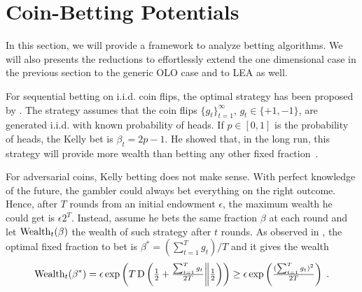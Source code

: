 \section{Coin-Betting Potentials}
\label{section:coin-betting-potentials}

In this section, we will provide a framework to analyze betting algorithms.
We will also presents the reductions to effortlessly extend the one dimensional case in the previous section to the
generic \ac{OLO} case and to \ac{LEA} as well.

For sequential betting on i.i.d. coin flips, the optimal strategy has been proposed by \citet{Kelly-1956}.
The strategy assumes that the coin flips $\{g_t\}_{t=1}^\infty$, $g_t
\in \{+1,-1\}$, are generated i.i.d. with known probability of heads. If $p \in
[0,1]$ is the probability of heads, the Kelly bet is $\beta_t = 2p - 1$. He
showed that, in the long run, this strategy will provide more wealth than
betting any other fixed fraction~\cite{Kelly-1956}.

For adversarial coins, Kelly betting does not make sense. With perfect knowledge
of the future, the gambler could always bet everything on the right outcome.
Hence, after $T$ rounds from an initial endowment $\epsilon$, the maximum
wealth he could get is $\epsilon 2^T$.  Instead, assume he bets the same
fraction $\beta$ at each round and let $\operatorname{Wealth}_t(\beta)$ the wealth of such strategy
after $t$ rounds. As observed in
\cite{McMahan-Abernethy-2013}, the optimal fixed fraction to bet is
$\beta^*=(\sum_{t=1}^T g_t)/T$ and it gives the wealth
\begin{equation}
\label{eq:opt_wealth}
\operatorname{Wealth}_t(\beta^*)
= \epsilon \exp\left(T \operatorname{D}\left({\tfrac{1}{2}+\tfrac{\sum_{t=1}^T g_t}{2T}}\middle\|{\tfrac{1}{2}}\right)\right)
\geq \epsilon \exp\left(\tfrac{(\sum_{t=1}^T g_t)^2}{2 T}\right) \; .
\end{equation}

